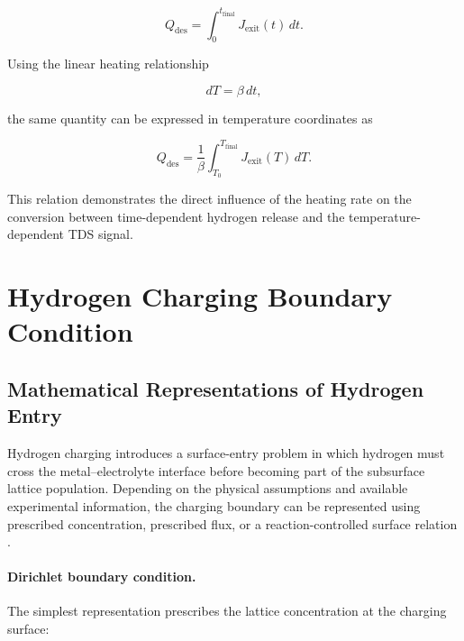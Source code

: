 \begin{equation}
Q_{\mathrm{des}}
=
\int_0^{t_{\mathrm{final}}}
J_{\mathrm{exit}}(t)\,dt.
\label{eq:ch3_cumulative_desorption_time}
\end{equation}

Using the linear heating relationship

\begin{equation}
dT=\beta\,dt,
\end{equation}

the same quantity can be expressed in temperature coordinates as

\begin{equation}
Q_{\mathrm{des}}
=
\frac{1}{\beta}
\int_{T_0}^{T_{\mathrm{final}}}
J_{\mathrm{exit}}(T)\,dT.
\label{eq:ch3_cumulative_desorption_temperature}
\end{equation}

This relation demonstrates the direct influence of the heating rate on
the conversion between time-dependent hydrogen release and the
temperature-dependent TDS signal.

\section{Hydrogen Charging Boundary Condition}
\label{sec:charging_boundary}

\subsection{Mathematical Representations of Hydrogen Entry}
\label{subsec:charging_BC_forms}

Hydrogen charging introduces a surface-entry problem in which hydrogen
must cross the metal--electrolyte interface before becoming part of the
subsurface lattice population. Depending on the physical assumptions
and available experimental information, the charging boundary can be
represented using prescribed concentration, prescribed flux, or a
reaction-controlled surface relation
\cite{Turnbull2014,MartinezPaneda2020,Koren2024a}.

\paragraph{Dirichlet boundary condition.}

The simplest representation prescribes the lattice concentration at
the charging surface:

